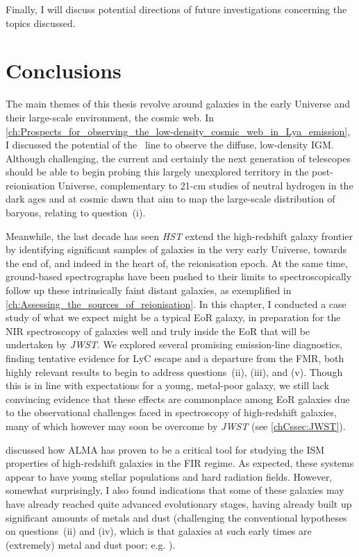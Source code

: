 Finally, I will discuss potential directions of future investigations concerning the topics discussed.

\section{Conclusions}
\label{chCsec:Conclusions}

The main themes of this thesis revolve around galaxies in the early Universe and their large-scale environment, the cosmic web. In \cref{ch:Prospects_for_observing_the_low-density_cosmic_web_in_Lya_emission}, I discussed the potential of the \lya\ line to observe the diffuse, low-density IGM. Although challenging, the current and certainly the next generation of telescopes should be able to begin probing this largely unexplored territory in the post-reionisation Universe, complementary to 21-cm studies of neutral hydrogen in the dark ages and at cosmic dawn that aim to map the large-scale distribution of baryons, relating to question~(i).

Meanwhile, the last decade has seen \textit{HST} extend the high-redshift galaxy frontier by identifying significant samples of galaxies in the very early Universe, towards the end of, and indeed in the heart of, the reionisation epoch. At the same time, ground-based spectrographs have been pushed to their limits to spectroscopically follow up these intrinsically faint distant galaxies, as exemplified in \cref{ch:Assessing_the_sources_of_reionisation}. In this chapter, I conducted a case study of what we expect might be a typical EoR galaxy, in preparation for the NIR spectroscopy of galaxies well and truly inside the EoR that will be undertaken by \textit{JWST}. We explored several promising emission-line diagnostics, finding tentative evidence for LyC escape and a departure from the FMR, both highly relevant results to begin to address questions~(ii), (iii), and (v). Though this is in line with expectations for a young, metal-poor galaxy, we still lack convincing evidence that these effects are commonplace among EoR galaxies due to the observational challenges faced in spectroscopy of high-redshift galaxies, many of which however may soon be overcome by \textit{JWST} (see \cref{chCssec:JWST}).

 discussed how ALMA has proven to be a critical tool for studying the ISM properties of high-redshift galaxies in the FIR regime. As expected, these systems appear to have young stellar populations and hard radiation fields. However, somewhat surprisingly, I also found indications that some of these galaxies may have already reached quite advanced evolutionary stages, having already built up significant amounts of metals and dust (challenging the conventional hypotheses on questions~(ii) and (iv), which is that galaxies at such early times are (extremely) metal and dust poor; e.g. \citealt{2016ARA&A..54..761S}).

